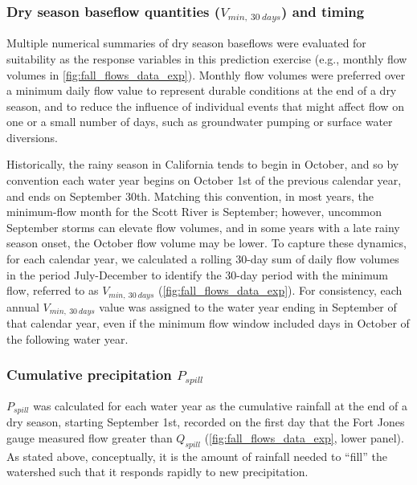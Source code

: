 \documentclass[hess, manuscript]{copernicus}
\begin{document}
\subsubsection{\texorpdfstring{Dry season baseflow quantities
(\(V_{min,~30~days}\)) and
timing}{Dry season baseflow quantities (V\_\{min,\textasciitilde30\textasciitilde days\}) and timing}}

Multiple numerical summaries of dry season baseflows were evaluated for
suitability as the response variables in this prediction exercise (e.g.,
monthly flow volumes in \autoref{fig:fall_flows_data_exp}). Monthly flow
volumes were preferred over a minimum daily flow value to represent
durable conditions at the end of a dry season, and to reduce the
influence of individual events that might affect flow on one or a small
number of days, such as groundwater pumping or surface water diversions.

Historically, the rainy season in California tends to begin in October,
and so by convention each water year begins on October 1st of the
previous calendar year, and ends on September 30th. Matching this
convention, in most years, the minimum-flow month for the Scott River is
September; however, uncommon September storms can elevate flow volumes,
and in some years with a late rainy season onset, the October flow
volume may be lower. To capture these dynamics, for each calendar year,
we calculated a rolling 30-day sum of daily flow volumes in the period
July-December to identify the 30-day period with the minimum flow,
referred to as \(V_{min,~30~days}\) (\autoref{fig:fall_flows_data_exp}).
For consistency, each annual \(V_{min,~30~days}\) value was assigned to
the water year ending in September of that calendar year, even if the
minimum flow window included days in October of the following water
year.

\subsubsection{\texorpdfstring{Cumulative precipitation
\(P_{spill}\)}{Cumulative precipitation P\_\{spill\}}}

\(P_{spill}\) was calculated for each water year as the cumulative
rainfall at the end of a dry season, starting September 1st, recorded on
the first day that the Fort Jones gauge measured flow greater than
\(Q_{spill}\) (\autoref{fig:fall_flows_data_exp}, lower panel). As
stated above, conceptually, it is the amount of rainfall needed to
``fill'' the watershed such that it responds rapidly to new
precipitation.
\end{document}
